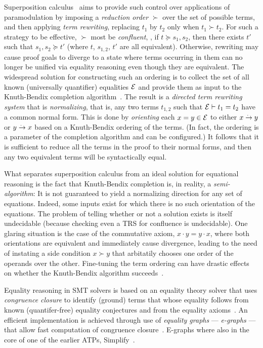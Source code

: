 Superposition calculus~\cite{superposition} aims to provide such control over applications of paramodulation
by imposing a \emph{reduction order} $\succ$ over the set of possible terms, and then applying \emph{term rewriting}, replacing $t_1$ by $t_2$ only when $t_1\succ t_2$.
For such a strategy to be effective, $\succ$ most be \emph{confluent}, \ie, if $t\succeq s_1,s_2$, then there
exists $t'$ such that $s_1,s_2 \succeq t'$ (where $t$, $s_{1,2}$, $t'$ are all equivalent).
Otherwise, rewriting may cause proof goals to diverge to
a state where terms occurring in them can no longer be unified via equality reasoning even though they are equivalent.
The widespread solution for constructing such an ordering is to collect the set of all known (universally quantifier) equalities $\mathcal{E}$ and provide them as input to the Knuth-Bendix completion algorithm~\cite{AR1983:Knuth}.
The result is a \emph{directed term rewriting system} that is \emph{normalizing}, that is, any two terms $t_{1,2}$ such that $\mathcal{E}\vdash t_1=t_2$
have a common normal form.
This is done by \emph{orienting} each $x=y \in \mathcal{E}$ to either $x\overset{.~}{\to} y$ or $y\overset{.~}{\to} x$ based on a Knuth-Bendix ordering of the terms.
(In fact, the ordering is a parameter of the completion algorithm and can be configured.)
It follows that it is sufficient to reduce all the terms in the proof to their normal forms, and then any two equivalent terms will be syntactically equal.

What separates superposition calculus from an ideal solution for equational reasoning is the fact that Knuth-Bendix completion is, in reality, a \emph{semi-algorithm}:
It is not guaranteed to yield a normalizing direction for any set of equations.
Indeed, some inputs exist for which there is no such orientation of the equations.
The problem of telling whether or not a solution exists is itself undecidable (because checking even a TRS for confluence is undecidable).
One glaring situation is the case of the commutative axiom, $x\cdot y = y\cdot x$, where both orientations are equivalent and immediately cause divergence,
leading to the need of instating a side condition $x\succ y$ that arbitatily chooses one order of the operands over the other.
Fine-tuning the term ordering can have drastic effects on whether the Knuth-Bendix algorithm succeeds~\cite{ICRTA2006:Wehrman}.

Equality reasoning in SMT solvers is based on an equality theory solver that uses \emph{congruence closure} to identify (ground) terms that whose equality follows from known (quantifer-free) equality conjectures and from the equality axioms~\cite{JACM1980:Nelson}.
An efficient implementation is achieved through use of \emph{equality graphs} --- \emph{e-graphs} --- that allow fast computation of congruence closure~\cite{Thesis1980:Nelson}.
E-graphs where also in the core of one of the earlier ATPs, Simplify~\cite{simplify}.

